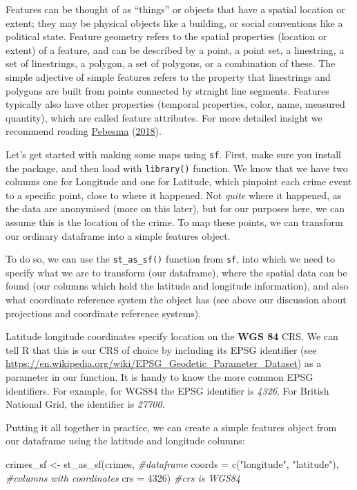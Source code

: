 \documentclass[
]{book}
\newenvironment{Shaded}{\begin{snugshade}}{\end{snugshade}}
\newcommand{\AttributeTok}[1]{\textcolor[rgb]{0.77,0.63,0.00}{#1}}
\newcommand{\CommentTok}[1]{\textcolor[rgb]{0.56,0.35,0.01}{\textit{#1}}}
\newcommand{\DecValTok}[1]{\textcolor[rgb]{0.00,0.00,0.81}{#1}}
\newcommand{\FunctionTok}[1]{\textcolor[rgb]{0.00,0.00,0.00}{#1}}
\newcommand{\NormalTok}[1]{#1}
\newcommand{\OtherTok}[1]{\textcolor[rgb]{0.56,0.35,0.01}{#1}}
\newcommand{\StringTok}[1]{\textcolor[rgb]{0.31,0.60,0.02}{#1}}
\begin{document}
Features can be thought of as ``things'' or objects that have a spatial location or extent; they may be physical objects like a building, or social conventions like a political state. Feature geometry refers to the spatial properties (location or extent) of a feature, and can be described by a point, a point set, a linestring, a set of linestrings, a polygon, a set of polygons, or a combination of these. The simple adjective of simple features refers to the property that linestrings and polygons are built from points connected by straight line segments. Features typically also have other properties (temporal properties, color, name, measured quantity), which are called feature attributes. For more detailed insight we recommend reading \protect\hyperlink{ref-Pebesma_2018}{Pebesma} (\protect\hyperlink{ref-Pebesma_2018}{2018}).

Let's get started with making some maps using \texttt{sf}. First, make sure you install the package, and then load with \texttt{library()} function. We know that we have two columns one for Longitude and one for Latitude, which pinpoint each crime event to a specific point, close to where it happened. Not \emph{quite} where it happened, as the data are anonymised (more on this later), but for our purposes here, we can assume this is the location of the crime. To map these points, we can transform our ordinary dataframe into a simple features object.

To do so, we can use the \texttt{st\_as\_sf()} function from \texttt{sf}, into which we need to specify what we are to transform (our dataframe), where the spatial data can be found (our columns which hold the latitude and longitude information), and also what coordinate reference system the object has (see above our discussion about projections and coordinate reference systems).

Latitude longitude coordinates specify location on the \textbf{WGS 84} CRS. We can tell R that this is our CRS of choice by including its EPSG identifier
(see \url{https://en.wikipedia.org/wiki/EPSG_Geodetic_Parameter_Dataset}) as a parameter in our function. It is handy to know the more common EPSG identifiers. For example, for WGS84 the EPSG identifier is \emph{4326}. For British National Grid, the identifier is \emph{27700}.

Putting it all together in practice, we can create a simple features object from our dataframe using the latitude and longitude columns:

\begin{Shaded}
\begin{Highlighting}[]
\NormalTok{crimes\_sf }\OtherTok{\textless{}{-}} \FunctionTok{st\_as\_sf}\NormalTok{(crimes,                                     }\CommentTok{\#dataframe}
                      \AttributeTok{coords =} \FunctionTok{c}\NormalTok{(}\StringTok{"longitude"}\NormalTok{, }\StringTok{"latitude"}\NormalTok{),        }\CommentTok{\#columns with coordinates}
                      \AttributeTok{crs =} \DecValTok{4326}\NormalTok{)                                 }\CommentTok{\#crs is WGS84}
\end{Highlighting}
\end{Shaded}
\end{document}
